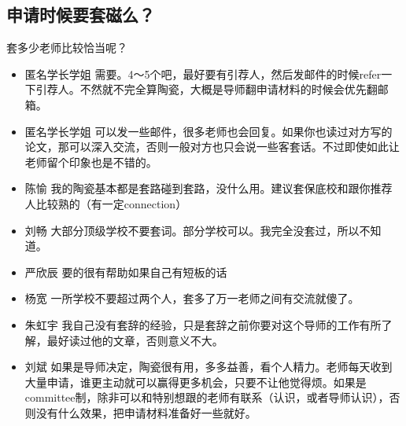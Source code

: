 \documentclass{vivid_layout}
\begin{document}
\subsection{申请时候要套磁么？}
套多少老师比较恰当呢？
\begin{itemize}
\item   {\name 匿名学长学姐}  \quad 需要。4～5个吧，最好要有引荐人，然后发邮件的时候refer一下引荐人。不然就不完全算陶瓷，大概是导师翻申请材料的时候会优先翻邮箱。
\item   {\name 匿名学长学姐}  \quad  可以发一些邮件，很多老师也会回复。如果你也读过对方写的论文，那可以深入交流，否则一般对方也只会说一些客套话。不过即使如此让老师留个印象也是不错的。
\item  { 陈愉}  \quad 我的陶瓷基本都是套路碰到套路，没什么用。建议套保底校和跟你推荐人比较熟的（有一定connection）
\item  { 刘畅}  \quad 大部分顶级学校不要套词。部分学校可以。我完全没套过，所以不知道。
\item  { 严欣辰}  \quad 要的很有帮助如果自己有短板的话
\item  { 杨宽}  \quad 一所学校不要超过两个人，套多了万一老师之间有交流就傻了。
\item  { 朱虹宇}  \quad 我自己没有套辞的经验，只是套辞之前你要对这个导师的工作有所了解，最好读过他的文章，否则意义不大。
\item  { 刘斌}  \quad 如果是导师决定，陶瓷很有用，多多益善，看个人精力。老师每天收到大量申请，谁更主动就可以赢得更多机会，只要不让他觉得烦。如果是committee制，除非可以和特别想跟的老师有联系（认识，或者导师认识），否则没有什么效果，把申请材料准备好一些就好。
\end{itemize}
\end{document}
